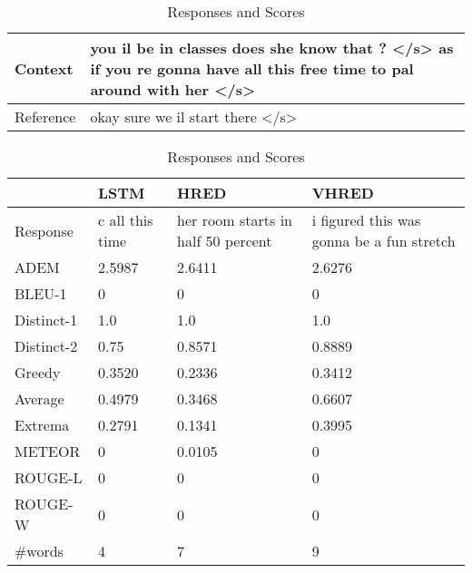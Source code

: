 \begin{table}
    \caption{An Example from OpenSubtitles}
    \centering
    \begin{subtable}{\textwidth}
        \centering
        \caption{Context and Reference}
        \begin{tabular}{|l|p{}|}
            \hline
            Context & you il be in classes does she know that ? </s> as if you re gonna have all this free time to pal around with her </s> \\
            \hline
            Reference & okay sure we il start there </s> \\
            \hline
        \end{tabular}
    \end{subtable}
    \begin{subtable}{\textwidth}
        \centering
        \caption{Responses and Scores}
        \begin{tabular}{|l|*{3}{p{}|}}
            \hline
            & LSTM & HRED & VHRED \\
            \hline
            Response & c all this time & her room starts in half 50 percent & i figured this was gonna be a fun stretch \\
            \hline
            ADEM & 2.5987 & 2.6411 & 2.6276 \\
            \hline
            BLEU-1 & 0 & 0 & 0 \\
            \hline
            Distinct-1 & 1.0 & 1.0 & 1.0 \\
            \hline
            Distinct-2 & 0.75 & 0.8571 & 0.8889 \\
            \hline
            Greedy & 0.3520 & 0.2336 & 0.3412 \\
            \hline
            Average & 0.4979 & 0.3468 & 0.6607 \\
            \hline
            Extrema & 0.2791 & 0.1341 & 0.3995 \\
            \hline
            METEOR & 0 & 0.0105 & 0 \\
            \hline
            ROUGE-L & 0 & 0 & 0 \\
            \hline
            ROUGE-W & 0 & 0 & 0 \\
            \hline
            \#words & 4 & 7 & 9 \\
            \hline
        \end{tabular}
    \end{subtable}
\end{table}
